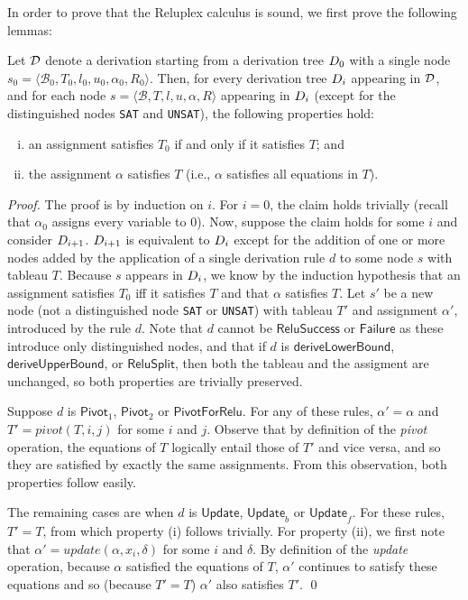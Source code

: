 \documentclass[a4paper]{llncs}
\newcommand{\basic}{\mathcal{B}}
\newcommand{\ub}{u}
\newcommand{\lb}{l}
\newcommand{\reluSet}{R}
\newcommand{\assignment}{\alpha{}}
\newcommand{\sat}{\texttt{SAT}}
\newcommand{\unsat}{\texttt{UNSAT}}
\newcommand{\rulename}[1]{\ensuremath{\mathsf{#1}}\xspace}
\newcommand{\irulename}[2]{\ensuremath{\mathsf{#1}_{#2}}\xspace}
\newcommand{\pivot}[1]{\irulename{Pivot}{#1}}
\newcommand{\failure}{\rulename{Failure}}
\newcommand{\update}{\rulename{Update}}
\newcommand{\updateb}{\irulename{Update}{b}}
\newcommand{\updatef}{\irulename{Update}{f}}
\newcommand{\reluSuccess}{\rulename{ReluSuccess}}
\newcommand{\pivotForRelu}{\rulename{PivotForRelu}}
\newcommand{\reluSplit}{\rulename{ReluSplit}}
\newcommand{\learnUB}{\rulename{deriveUpperBound}}
\newcommand{\learnLB}{\rulename{deriveLowerBound}}
\newcommand{\pivotOperation}{\textit{pivot}}
\newcommand{\updateOperation}{\textit{update}}
\begin{document}
In order to prove that the Reluplex calculus is sound, we first prove the
following lemmas:

\begin{lemma}
\label{lemma:sameTableau}
\sloppy
Let $\mathcal{D}$ denote a derivation starting from a derivation tree $D_0$ with a single node 
$s_0 = \langle \basic_0, T_0, \lb_0, \ub_0, \assignment_0, \reluSet_0 \rangle$.
Then, for every derivation tree $D_i$ appearing in $\mathcal{D}$,
and for each node $s = \langle \basic, T, \lb, \ub, \assignment, \reluSet\rangle$
appearing in $D_i$ (except for the distinguished nodes \sat{} and
\unsat{}), the following properties hold:
\begin{enumerate}[(i)]
\item an assignment satisfies $T_0$ if and only if it satisfies $T$; and
\item the assignment $\assignment$ satisfies $T$ (i.e., $\assignment$
  satisfies all equations in $T$).
\end{enumerate}
\end{lemma}
\begin{proof}
The proof is by induction on $i$.  For $i = 0$, the claim holds trivially
(recall that $\assignment_0$ assigns every variable to 0).
Now, suppose the claim holds for some $i$ and consider
$D_{i+1}$.  $D_{i+1}$ is equivalent to
$D_i$ except for the addition of one or more nodes added by the
application of a single derivation rule $d$ to some node $s$ with tableau $T$.
Because $s$ appears in $D_i$,
we know by the induction hypothesis that
an assignment satisfies $T_0$ iff it satisfies $T$ and that
$\assignment$ satisfies $T$.
Let $s'$ be a new node (not a distinguished node \sat{} or
\unsat{}) with tableau $T'$ and assignment $\assignment'$, introduced by the rule $d$.
Note that $d$ cannot be \reluSuccess{} or \failure{} as these introduce only
distinguished nodes, and that if $d$ is \learnLB{}, \learnUB{}, or \reluSplit{},
then both the tableau and the assigment are unchanged, so
both properties are trivially preserved.

Suppose $d$ is \pivot{1}, \pivot{2} or
\pivotForRelu{}. For any of these rules, $\assignment' = \assignment$ and
$T'=\pivotOperation{}(T,i,j)$ for some $i$ and $j$. Observe that by definition of
the \pivotOperation{} operation, the equations of $T$ logically entail those of
$T'$ and vice versa, and so they are satisfied by exactly the same
assignments.  From this observation, both properties follow easily.

The remaining cases are when $d$ is \update{}, \updateb{} or
\updatef{}. For these rules, $T' = T$, from which property (i) follows
trivially.  For property (ii), we first note that
$\assignment'=\updateOperation{}(\assignment,x_i,\delta)$ for some $i$ and
$\delta$. By definition of
the \updateOperation{} operation, because $\assignment$ satisfied the
equations of $T$, $\assignment'$ continues to satisfy these equations and so
(because $T' = T$) $\assignment'$ also satisfies $T'$.
\qed
\end{proof}
\end{document}
